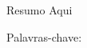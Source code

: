 \begin{resumo}[RESUMO]
\vspace*{-6mm}
    
    Resumo Aqui

    Palavras-chave:
    
\end{resumo}










